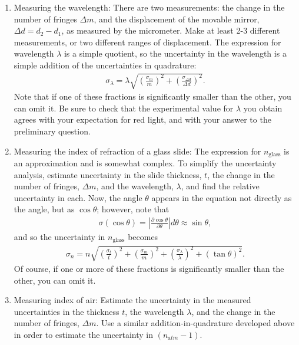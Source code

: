 \begin{enumerate}

\item Measuring the wavelength: There are two measurements: the change in the
  number of fringes $\Delta m$, and the displacement of the movable mirror,
  $\Delta d = d_2-d_1$, as measured by the micrometer. Make at least 2-3
  different measurements, or two different ranges of displacement.  The
  expression for wavelength $\lambda$ is a simple quotient, so the uncertainty
  in the wavelength is a simple addition of the uncertainties in quadrature:
  \begin{align*}
    \sigma_\lambda = \lambda \sqrt{\left(\frac{\sigma_m}{m}\right)^2 +
      \left(\frac{\sigma_{\Delta d}}{\Delta d}\right)^2}.
  \end{align*}
  Note that if one of these fractions is significantly smaller than the other,
  you can omit it. Be sure to check that the experimental value
  for $\lambda$ you obtain agrees with your expectation for red light, and with
  your answer to the preliminary question.

\item Measuring the index of refraction of a glass slide: The expression for
  $n_{\mathrm{glass}}$ is an approximation and is somewhat complex. To simplify
  the uncertainty analysis, estimate uncertainty in the slide thickness, $t$,
  the change in the number of fringes, $\Delta m$, and the wavelength,
  $\lambda$, and find the relative uncertainty in each. Now, the angle $\theta$ appears
  in the equation not directly as the angle, but as $\cos\theta$; however, note
  that
  \begin{align*}
    \sigma(\cos\theta) = \left| \frac{\partial
      \cos\theta}{\partial\theta}\right| d\theta \approx \sin\theta,
  \end{align*}
  and so the uncertainty in $n_{\mathrm{glass}}$ becomes
  \begin{align*}
    \sigma_n = n \sqrt{\left(\frac{\sigma_t}{t}\right)^2 +
      \left(\frac{\sigma_m}{m}\right)^2 +
      \left(\frac{\sigma_\lambda}{\lambda}\right)^2 + (\tan\theta)^2}.
  \end{align*}
  Of course, if one or more of these fractions is significantly smaller than the
  other, you can omit it.

\item Measuring index of air: Estimate the uncertainty in the measured
  uncertainties in the thickness $t$, the wavelength $\lambda$, and the change
  in the number of fringes, $\Delta m$.  Use a similar addition-in-quadrature
  developed above in order to estimate the uncertainty in $(n_{\mathrm
    atm}-1)$. 
\end{enumerate}

